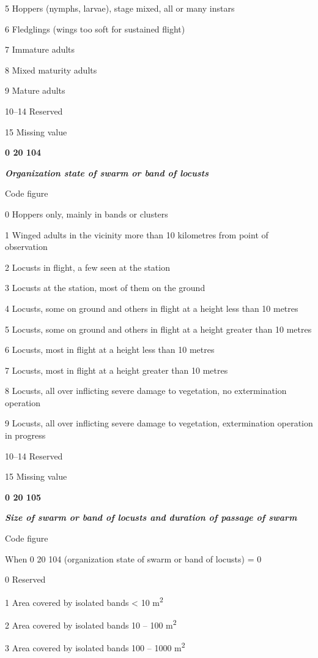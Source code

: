 5 Hoppers (nymphs, larvae), stage mixed, all or many instars

6 Fledglings (wings too soft for sustained flight)

7 Immature adults

8 Mixed maturity adults

9 Mature adults

10--14 Reserved

15 Missing value

\textbf{0 20 104}

\emph{\textbf{Organization state of swarm or band of locusts}}

Code figure

0 Hoppers only, mainly in bands or clusters

1 Winged adults in the vicinity more than 10 kilometres from point of observation

2 Locusts in flight, a few seen at the station

3 Locusts at the station, most of them on the ground

4 Locusts, some on ground and others in flight at a height less than 10 metres

5 Locusts, some on ground and others in flight at a height greater than 10 metres

6 Locusts, most in flight at a height less than 10 metres

7 Locusts, most in flight at a height greater than 10 metres

8 Locusts, all over inflicting severe damage to vegetation, no extermination operation

9 Locusts, all over inflicting severe damage to vegetation, extermination operation in progress

10--14 Reserved

15 Missing value

\textbf{0 20 105}

\emph{\textbf{Size of swarm or band of locusts and duration of passage of swarm}}

Code figure

When 0 20 104 (organization state of swarm or band of locusts) = 0

0 Reserved

1 Area covered by isolated bands \textless{} 10 m\textsuperscript{2}

2 Area covered by isolated bands 10 -- 100 m\textsuperscript{2}

3 Area covered by isolated bands 100 -- 1000 m\textsuperscript{2}

